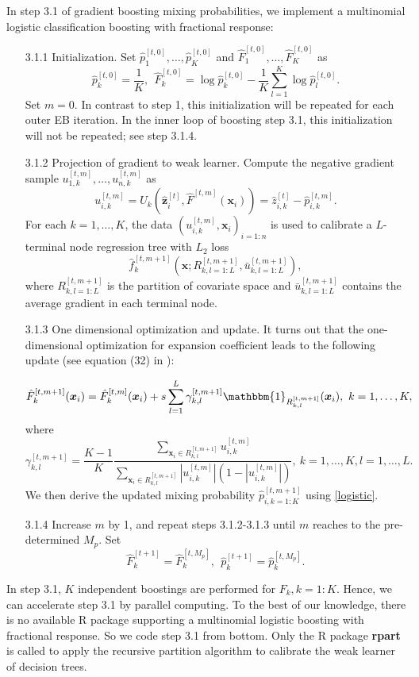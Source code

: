 \documentclass[11pt]{article}
\numberwithin{equation}{section}
\def\bx{\boldsymbol{x}}
\def\bz{\boldsymbol{z}}
\begin{document}
In step 3.1 of gradient boosting mixing probabilities, we implement a  multinomial logistic classification boosting with fractional response: 
	\begin{enumerate}
		\item[3.1.1] Initialization. Set $\hat{p}_1^{[t,0]}, \ldots, \hat{p}_K^{[t,0]}$ and $\hat{F}_1^{[t,0]}, \ldots, \hat{F}_{K}^{[t,0]}$ as
		\begin{equation}\label{ini-1}			
		\hat{p}_k^{[t,0]}=\frac{1}{K},
		~~\hat{F}_k^{[t,0]}=\log \hat{p}_k^{[t,0]}-\frac{1}{K}\sum_{l=1}^K\log \hat{p}_l^{[t,0]}.
	\end{equation}
		Set $m=0$. In contrast to step 1, this initialization will be repeated for each outer EB iteration.
		In the inner loop of boosting step 3.1, this initialization will not be repeated; see step 3.1.4. 
		\item[3.1.2] Projection of gradient to weak learner.
		Compute the negative gradient sample $u_{1,k}^{[t,m]},\ldots,u_{n,k}^{[t,m]}$ as
		$$u_{i,k}^{[t,m]}=U_k(\hat{\bz}_{i}^{[t]},\hat{F}^{[t,m]}(\bx_i))=\hat{z}_{i,k}^{[t]}-\hat{p}_{i,k}^{[t,m]}.$$
		For each $k=1,\ldots, K$, the data $(u_{i,k}^{[t,m]},\bx_i)_{i=1:n}$ is used to calibrate a $L$-terminal node regression tree with $L_2$ loss $$\hat{f}_k^{[t,m+1]}\left(\bx;R^{[t,m+1]}_{k,l=1:L},\bar{u}^{[t,m+1]}_{k,l=1:L}\right),$$
		where $R^{[t,m+1]}_{k,l=1:L}$ is the partition of covariate space and $\bar{u}^{[t,m+1]}_{k,l=1:L}$ contains the average gradient in each terminal node.
		
		
	
		\item[3.1.3] One dimensional optimization and update. It turns out that  the one-dimensional optimization for expansion coefficient leads to the following update (see equation (32) in \citet{friedman2001greedy}):
		
		$$\hat{F}_k^{[t,m+1]}(\bx_i)=\hat{F}_k^{[t,m]}(\bx_i)+s\sum_{l=1}^L\gamma^{[t,m+1]}_{k,l}\mathbbm{1}_{R^{[t,m+1]}_{k,l}}(\bx_i),~ k=1,\ldots,K,$$
		where
		$$\gamma^{[t,m+1]}_{k,l}=\frac{K-1}{K}\frac{\sum_{\bx_i\in R_{k,l}^{[t,m+1]}}u_{i,k}^{[t,m]}}{\sum_{\bx_i\in R_{k,l}^{[t,m+1]}}\left|u_{i,k}^{[t,m]}\right|\left(1-\left|u_{i,k}^{[t,m]}\right|\right)}, ~k=1,\ldots,K, l=1,\ldots,L.$$
		We then derive the updated mixing probability $\hat{p}^{[t,m+1]}_{i,k=1:K}$  using \eqref{logistic}.
		
		
	
		\item[3.1.4] Increase $m$ by 1, and repeat steps 3.1.2-3.1.3  until $m$ reaches to the pre-determined $M_p$.
		Set $$\hat{F}_k^{[t+1]}=\hat{F}_k^{[t,M_p]},~~\hat{p}_k^{[t+1]}=\hat{p}_k^{[t,M_p]}.$$
	\end{enumerate}
In step 3.1, $K$ independent boostings are performed for $F_k, k=1:K$. Hence, we can accelerate  step 3.1 by parallel computing.
To the best of our knowledge, there is no available R package supporting a  multinomial logistic boosting with fractional response.
So we code step 3.1 from bottom. Only the  R package {\bf rpart} is called to apply the recursive partition algorithm to calibrate the weak learner of decision trees.
\end{document}
